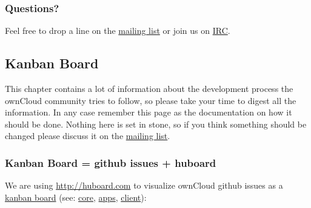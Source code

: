 \documentclass[letterpaper,10pt,english]{sphinxmanual}
\begin{document}
\subsubsection{Questions?}
\label{bugtracker/codereviews:questions}
Feel free to drop a line on the \href{https://mailman.owncloud.org/mailman/listinfo/devel}{mailing list} or join us on \href{http://webchat.freenode.net/?channels=owncloud-dev}{IRC}.


\subsection{Kanban Board}
\label{bugtracker/kanban:irc}\label{bugtracker/kanban::doc}\label{bugtracker/kanban:kanban-board}
This chapter contains a lot of information about the development process the
ownCloud community tries to follow, so please take your time to digest all the
information. In any case remember this page as the documentation on how it
should be done. Nothing here is set in stone, so if you think something should
be changed please discuss it on the \href{mailto:owncloud@kde.org}{mailing list}.


\subsubsection{Kanban Board = github issues + huboard}
\label{bugtracker/kanban:kanban-board-github-issues-huboard}
We are using \href{http://huboard.com}{http://huboard.com} to visualize ownCloud github issues as a \href{http://en.wikipedia.org/wiki/Kanban\_board}{kanban
board} (see: \href{http://huboard.com/owncloud/core/board/\#}{core}, \href{http://huboard.com/owncloud/apps/board/\#}{apps}, \href{http://huboard.com/owncloud/client/board/\#}{client}):
\begin{figure}[htbp]
\centering

\end{figure}
\end{document}
